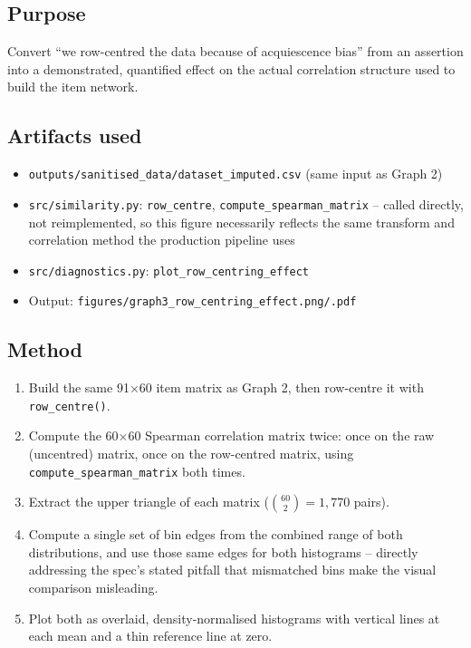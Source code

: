 \documentclass[11pt]{article}
\begin{document}
\subsection{Purpose}
Convert ``we row-centred the data because of acquiescence bias'' from an
assertion into a demonstrated, quantified effect on the actual correlation
structure used to build the item network.

\subsection{Artifacts used}
\begin{itemize}
  \item \texttt{outputs/sanitised\_data/dataset\_imputed.csv} (same input as
        Graph 2)
  \item \texttt{src/similarity.py}: \texttt{row\_centre}, \texttt{compute\_spearman\_matrix}
        -- called directly, not reimplemented, so this figure necessarily
        reflects the same transform and correlation method the production
        pipeline uses
  \item \texttt{src/diagnostics.py}: \texttt{plot\_row\_centring\_effect}
  \item Output: \texttt{figures/graph3\_row\_centring\_effect.png/.pdf}
\end{itemize}

\subsection{Method}
\begin{enumerate}
  \item Build the same 91$\times$60 item matrix as Graph 2, then row-centre
        it with \texttt{row\_centre()}.
  \item Compute the 60$\times$60 Spearman correlation matrix twice: once on
        the raw (uncentred) matrix, once on the row-centred matrix, using
        \texttt{compute\_spearman\_matrix} both times.
  \item Extract the upper triangle of each matrix
        ($\binom{60}{2} = 1{,}770$ pairs).
  \item Compute a single set of bin edges from the combined range of both
        distributions, and use those same edges for both histograms --
        directly addressing the spec's stated pitfall that mismatched bins
        make the visual comparison misleading.
  \item Plot both as overlaid, density-normalised histograms with vertical
        lines at each mean and a thin reference line at zero.
\end{enumerate}
\end{document}

